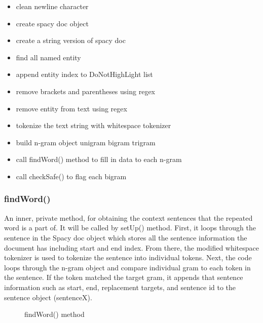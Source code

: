 \documentclass[12pt,oneside,openright,a4paper]{cpe-english-project}
\begin{document}
\begin{itemize}
\item clean newline character
\item create spacy doc object
\item create a string version of spacy doc
\item find all named entity
\item append entity index to DoNotHighLight list
\item remove brackets and parentheses using regex
\item remove entity from text using regex
\item tokenize the text string with whitespace tokenizer
\item build n-gram object unigram bigram trigram
\item call findWord() method to fill in data to each n-gram
\item call checkSafe() to flag each bigram 
\end{itemize}

\subsubsection{ findWord()} 
An inner, private method, for obtaining the context sentences that the repeated word is a part of. It will be called by setUp() method. First, it loops through the sentence in the Spacy doc object which stores all the sentence information the document has including start and end index. From there, the modified whitespace tokenizer is used to tokenize the sentence into individual tokens. Next, the code loops through the n-gram object and compare individual gram to each token in the sentence. If the token matched the target gram, it appends that sentence information such as start, end, replacement targets, and sentence id to the sentence object (sentenceX).
\begin{figure}[!h]\centering
\setlength{\fboxrule}{0.2mm} %
\setlength{\fboxsep}{1cm}
\caption{findWord() method}\label{fig:findWord() method}
\end{figure}
\end{document}
